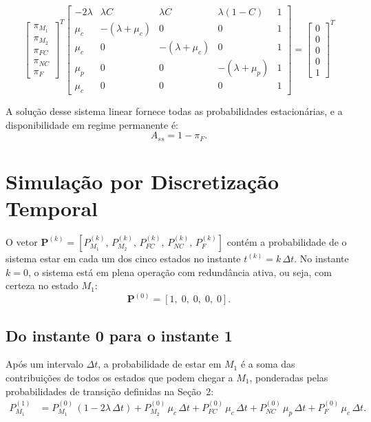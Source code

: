 \documentclass[12pt]{article}
\begin{document}
\[
\begin{bmatrix}
\pi_{M_1} \\ \pi_{M_2} \\ \pi_{FC} \\ \pi_{NC} \\ \pi_F
\end{bmatrix}^{T}
\begin{bmatrix}
-2\lambda       & \lambda C          & \lambda C          & \lambda(1-C)       & 1 \\
\mu_c           & -(\lambda + \mu_c) & 0                  & 0                  & 1 \\
\mu_c           & 0                  & -(\lambda + \mu_c) & 0                  & 1 \\
\mu_p           & 0                  & 0                  & -(\lambda + \mu_p) & 1 \\
\mu_c           & 0                  & 0                  & 0                  & 1
\end{bmatrix}
=
\begin{bmatrix}
0 \\ 0 \\ 0 \\ 0 \\ 1
\end{bmatrix}^{T}
\]

A solução desse sistema linear fornece todas as probabilidades estacionárias,
e a disponibilidade em regime permanente é:
\[
    \boxed{A_{ss} = 1 - \pi_F.}
\]

\newpage
\section{Simulação por Discretização Temporal}

O vetor $\mathbf{P}^{(k)} = [P_{M_1}^{(k)},\, P_{M_2}^{(k)},\, P_{FC}^{(k)},\,
P_{NC}^{(k)},\, P_F^{(k)}]$ contém a probabilidade de o sistema estar em cada
um dos cinco estados no instante $t^{(k)} = k\,\Delta t$. No instante $k = 0$,
o sistema está em plena operação com redundância ativa, ou seja, com certeza
no estado $M_1$:
\[
    \mathbf{P}^{(0)} = [1,\; 0,\; 0,\; 0,\; 0].
\]

\subsection*{Do instante 0 para o instante 1}

Após um intervalo $\Delta t$, a probabilidade de estar em $M_1$ é a soma
das contribuições de todos os estados que podem chegar a $M_1$, ponderadas
pelas probabilidades de transição definidas na Seção~2:
\begin{align*}
P_{M_1}^{(1)} &= P_{M_1}^{(0)}\,(1 - 2\lambda\,\Delta t)
               + P_{M_2}^{(0)}\,\mu_c\,\Delta t
               + P_{FC}^{(0)}\,\mu_c\,\Delta t
               + P_{NC}^{(0)}\,\mu_p\,\Delta t
               + P_{F}^{(0)}\,\mu_c\,\Delta t.
\end{align*}
\end{document}
